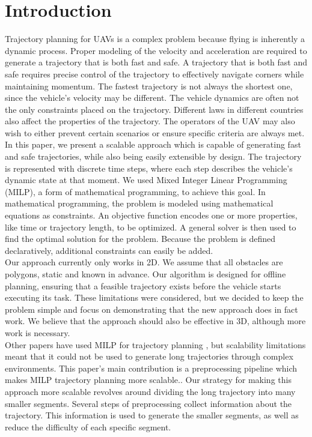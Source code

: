 \section{Introduction}
Trajectory planning for UAVs is a complex problem because flying is inherently a dynamic process. Proper modeling of the velocity and acceleration are required to generate a trajectory that is both fast and safe. A trajectory that is both fast and safe requires precise control of the trajectory to effectively navigate corners while maintaining momentum. The fastest trajectory is not always the shortest one, since the vehicle's velocity may be different. The vehicle dynamics are often not the only constraints placed on the trajectory. Different laws in different countries also affect the properties of the trajectory. The operators of the UAV may also wish to either prevent certain scenarios or ensure specific criteria are always met. \\
In this paper, we present a scalable approach which is capable of generating fast and safe trajectories, while also being easily extensible by design. The trajectory is represented with discrete time steps, where each step describes the vehicle's dynamic state at that moment. We used Mixed Integer Linear Programming (MILP), a form of mathematical programming, to achieve this goal. In mathematical programming, the problem is modeled using mathematical equations as constraints. An objective function encodes one or more properties, like time or trajectory length, to be optimized. A general solver is then used to find the optimal solution for the problem. Because the problem is defined declaratively, additional constraints can easily be added.\\
Our approach currently only works in 2D. We assume that all obstacles are polygons, static and known in advance. Our algorithm is designed for offline planning, ensuring that a feasible trajectory exists before the vehicle starts executing its task. These limitations were considered, but we decided to keep the problem simple and focus on demonstrating that the new approach does in fact work. We believe that the approach should also be effective in 3D, although more work is necessary.\\
Other papers have used MILP for trajectory planning \cite{Schouwenaars2001}, but scalability limitations meant that it could not be used to generate long trajectories through complex environments. This paper's main contribution is a preprocessing pipeline which makes MILP trajectory planning more scalable.. Our strategy for making this approach more scalable revolves around dividing the long trajectory into many smaller segments. Several steps of preprocessing collect information about the trajectory. This information is used to generate the smaller segments, as well as reduce the difficulty of each specific segment. \\
